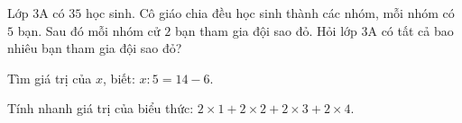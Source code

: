 \begin{ex} %
Lớp 3A có $35$ học sinh. Cô giáo chia đều học sinh thành các nhóm, mỗi nhóm có $5$ bạn. Sau đó mỗi nhóm cử $2$ bạn tham gia đội sao đỏ. Hỏi lớp 3A có tất cả bao nhiêu bạn tham gia đội sao đỏ?
\end{ex}

\begin{ex} %
Tìm giá trị của $x$, biết: $x : 5 = 14 - 6$.
\end{ex}

\begin{ex} %
Tính nhanh giá trị của biểu thức: $2 \times 1 + 2 \times 2 + 2 \times 3 + 2 \times 4$.
\end{ex}
